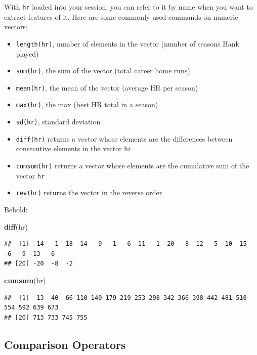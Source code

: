 \documentclass[
]{book}
\newenvironment{Shaded}{\begin{snugshade}}{\end{snugshade}}
\newcommand{\FunctionTok}[1]{\textcolor[rgb]{0.13,0.29,0.53}{\textbf{#1}}}
\newcommand{\NormalTok}[1]{#1}
\providecommand{\tightlist}{%
  \setlength{\itemsep}{0pt}\setlength{\parskip}{0pt}}
\theoremstyle{definition}
\theoremstyle{definition}
\theoremstyle{definition}
\theoremstyle{definition}
\theoremstyle{remark}
\begin{document}
With \texttt{hr} loaded into your session, you can refer to it by name when you want to extract features of it. Here are some commonly used commands on numeric vectors:

\begin{itemize}
\tightlist
\item
  \texttt{length(hr)}, number of elements in the vector (number of seasons Hank played)
\item
  \texttt{sum(hr)}, the sum of the vector (total career home runs)
\item
  \texttt{mean(hr)}, the mean of the vector (average HR per season)
\item
  \texttt{max(hr)}, the max (best HR total in a season)
\item
  \texttt{sd(hr)}, standard deviation
\item
  \texttt{diff(hr)} returns a vector whose elements are the differences between consecutive elements in the vector \texttt{hr}
\item
  \texttt{cumsum(hr)} returns a vector whose elements are the cumulative sum of the vector \texttt{hr}
\item
  \texttt{rev(hr)} returns the vector in the reverse order
\end{itemize}

Behold:

\begin{Shaded}
\begin{Highlighting}[]
\FunctionTok{diff}\NormalTok{(hr)}
\end{Highlighting}
\end{Shaded}

\begin{verbatim}
##  [1]  14  -1  18 -14   9   1  -6  11  -1 -20   8  12  -5 -10  15  -6   9 -13   6
## [20] -20  -8  -2
\end{verbatim}

\begin{Shaded}
\begin{Highlighting}[]
\FunctionTok{cumsum}\NormalTok{(hr)}
\end{Highlighting}
\end{Shaded}

\begin{verbatim}
##  [1]  13  40  66 110 140 179 219 253 298 342 366 398 442 481 510 554 592 639 673
## [20] 713 733 745 755
\end{verbatim}

\subsection*{Comparison Operators}\label{comparison-operators}
\end{document}
